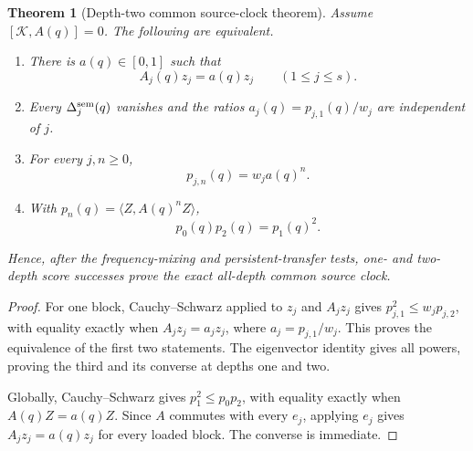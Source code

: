 \documentclass[11pt]{article}
\newtheorem{theorem}{Theorem}[section]
\theoremstyle{definition}
\theoremstyle{remark}
\begin{document}
\begin{theorem}[Depth-two common source-clock theorem]
\label{thm:semantic-clock-depth-two-master}
Assume $[\mathscr K,A(q)]=0$.  The following are equivalent.
\begin{enumerate}[label=\textup{(\roman*)},leftmargin=2.8em]
\item There is $a(q)\in[0,1]$ such that
      \begin{equation}
        \boxed{A_j(q)z_j=a(q)z_j\qquad(1\le j\le s).}
        \label{eq:semantic-common-eigen-master}
      \end{equation}
\item Every $\Delta_j^{\rm sem}(q)$ vanishes and the ratios
      $a_j(q)=p_{j,1}(q)/w_j$ are independent of $j$.
\item For every $j,n\ge0$,
      \begin{equation}
        \boxed{p_{j,n}(q)=w_ja(q)^n.}
        \label{eq:semantic-common-moments-master}
      \end{equation}
\item With $p_n(q)=\langle Z,A(q)^nZ\rangle$,
      \begin{equation}
        \boxed{p_0(q)p_2(q)=p_1(q)^2.}
        \label{eq:semantic-global-depth-two-master}
      \end{equation}
\end{enumerate}
Hence, after the frequency-mixing and persistent-transfer tests, one- and
two-depth score successes prove the exact all-depth common source clock.
\end{theorem}

\begin{proof}
For one block, Cauchy--Schwarz applied to $z_j$ and $A_jz_j$ gives
$p_{j,1}^2\le w_jp_{j,2}$, with equality exactly when
$A_jz_j=a_jz_j$, where $a_j=p_{j,1}/w_j$.  This proves the equivalence of the
first two statements.  The eigenvector identity gives all powers, proving the
third and its converse at depths one and two.

Globally, Cauchy--Schwarz gives $p_1^2\le p_0p_2$, with equality exactly when
$A(q)Z=a(q)Z$.  Since $A$ commutes with every $e_j$, applying $e_j$ gives
$A_jz_j=a(q)z_j$ for every loaded block.  The converse is immediate.
\end{proof}
\end{document}
